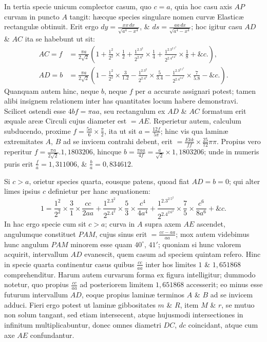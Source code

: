 In tertia specie unicum complector casum, quo $c=a$, quia hoc casu axis $AP$ curvam in puncto $A$ tangit: hæcque species singulare nomen curvæ Elasticæ rectangulæ obtinuit. Erit ergo $dy=\frac{xx\,dx}{\sqrt{a^4-x^4}}$, \& $ds=\frac{aa\,dx}{\sqrt{a^4-x^4}}$; hoc igitur casu $AD$ \& $AC$ ita se habebunt ut sit:
\[\begin{aligned}
AC=f&=\frac{\pi a}{2\sqrt2}\left(1+\frac{1^2}{2^2}\times\frac12+\frac{1^2.3^2}{2^2.4^2}\times\frac14+\frac{1^2.3^2.5^2}{2^2.4^2.6^2}\times\frac18+\&c.\right),\\
AD=b&=\frac{\pi a}{2\sqrt2}\left(1-\frac{1^2}{2^2}\times\frac3{1.2}-\frac{1^2.3^2}{2^2.4^2}\times\frac5{3.4}-\frac{1^2.3^2.5^2}{2^2.4^2.6^2}\times\frac7{5.8}-\&c.\right).
\end{aligned}\]
Quanquam autem hinc, neque $b$, neque $f$ per $a$ accurate assignari potest; tamen alibi insignem relationem inter has quantitates locum habere demonstravi. Scilicet ostendi esse $4bf=\pi aa$, seu rectangulum ex $AD$ \& $AC$ formatum erit æquale areæ Circuli cujus diameter est $=AE$. Reperietur autem, calculum subducendo, proxime $f=\frac{5a}6\times\frac\pi2$, ita ut sit $a=\frac{12f}{5\pi}$; hinc vis qua laminæ extremitates $A$, $B$ ad se invicem contrahi debent, erit $=\frac{Ekk}{ff}\times\frac{25}{72}\pi\pi$. Propius vero reperitur $f=\frac{\pi a}{2\sqrt2}.1{,}1803206$, hincque $b=\frac{\pi aa}{4f}=\frac a{\sqrt2}\times1{,}1803206$; unde in numeris puris erit $\frac fa=1{,}311006$, \& $\frac ba=0{,}834612$.

Si $c>a$, orietur species quarta, eousque patens, quoad fiat $AD=b=0$; qui alter limes ipsius $c$ definietur per hanc æquationem:
\[1=\frac{1^2}{2^2}\times\frac31\times\frac{cc}{2aa}+\frac{1^2.3^2}{2^2.4^2}\times\frac53\times\frac{c^4}{4a^4}+\frac{1^2.3^2.5^2}{2^2.4^2.6^2}\times\frac75\times\frac{c^6}{8a^6}+\&c.\]
In hac ergo specie cum sit $c>a$; curva in $A$ supra axem $AE$ ascendet, angulumque constituet $PAM$, cujus sinus erit $=\frac{cc-aa}{aa}$; mox autem videbimus hunc angulum $PAM$ minorem esse quam $40^\circ$, $41'$; quoniam si hunc valorem acquirit, intervallum $AD$ evanescit, quem casum ad speciem quintam refero. Hinc in specie quarta continentur casus quibus $\frac{cc}{aa}$ inter hos limites $1$ \& $1{,}651868$ comprehenditur. Harum autem curvarum forma ex figura intelligitur; dummodo notetur, quo propius $\frac{cc}{aa}$ ad posteriorem limitem $1{,}651868$ accesserit; eo minus esse futurum intervallum $AD$, eoque propius laminæ terminos $A$ \& $B$ ad se invicem adduci. Fieri ergo potest ut laminæ gibbositates $m$ \& $R$, item $M$ \& $r$, se mutuo non solum tangant, sed etiam intersecent, atque hujusmodi intersectiones in infinitum multiplicabuntur, donec omnes diametri $DC$, $dc$ coincidant, atque cum axe $AE$ confundantur.

